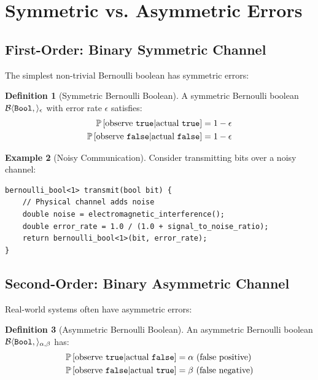 \documentclass[11pt,twoside,openright]{book}
\theoremstyle{definition}
\newtheorem{definition}{Definition}[chapter]
\newtheorem{example}[definition]{Example}
\theoremstyle{plain}
\theoremstyle{remark}
\begin{document}
\section{Symmetric vs. Asymmetric Errors}

\subsection{First-Order: Binary Symmetric Channel}

The simplest non-trivial Bernoulli boolean has symmetric errors:

\begin{definition}[Symmetric Bernoulli Boolean]
A symmetric Bernoulli boolean $\mathcal{B}\langle \mathtt{Bool},  \rangle_\epsilon$ with error rate $\epsilon$ satisfies:
\begin{align}
\mathbb{P}\left[\text{observe } \mathtt{true} | \text{actual } \mathtt{true}\right] &= 1 - \epsilon \\
\mathbb{P}\left[\text{observe } \mathtt{false} | \text{actual } \mathtt{false}\right] &= 1 - \epsilon
\end{align}
\end{definition}

\begin{example}[Noisy Communication]
Consider transmitting bits over a noisy channel:
\begin{verbatim}
bernoulli_bool<1> transmit(bool bit) {
    // Physical channel adds noise
    double noise = electromagnetic_interference();
    double error_rate = 1.0 / (1.0 + signal_to_noise_ratio);
    return bernoulli_bool<1>(bit, error_rate);
}
\end{verbatim}
\end{example}

\subsection{Second-Order: Binary Asymmetric Channel}

Real-world systems often have asymmetric errors:

\begin{definition}[Asymmetric Bernoulli Boolean]
An asymmetric Bernoulli boolean $\mathcal{B}\langle \mathtt{Bool},  \rangle_{\alpha,\beta}$ has:
\begin{align}
\mathbb{P}\left[\text{observe } \mathtt{true} | \text{actual } \mathtt{false}\right] &= \alpha \text{ (false positive)} \\
\mathbb{P}\left[\text{observe } \mathtt{false} | \text{actual } \mathtt{true}\right] &= \beta \text{ (false negative)}
\end{align}
\end{definition}
\end{document}
